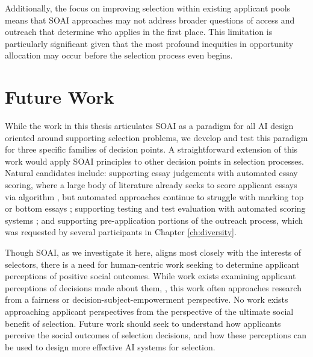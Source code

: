 Additionally, the focus on improving selection within existing applicant pools means that SOAI approaches may not address broader questions of access and outreach that determine who applies in the first place. This limitation is particularly significant given that the most profound inequities in opportunity allocation may occur before the selection process even begins.

\section{Future Work}
While the work in this thesis articulates SOAI as a paradigm for all AI design oriented around supporting selection problems, we develop and test this paradigm for three specific families of decision points. A straightforward extension of this work would apply SOAI principles to other decision points in selection processes. Natural candidates include: supporting essay judgements with automated essay scoring, where a large body of literature already seeks to score applicant essays via algorithm \cite{cozma_automated_2018,ramesh_automated_2022,wang_use_2022,elijahthesis}, but automated approaches continue to struggle with marking top or bottom essays \cite{elijahthesis}; supporting testing and test evaluation with automated scoring systems \cite{organisciak_beyond_2023,condon2014international}; and supporting pre-application portions of the outreach process, which was requested by several participants in Chapter \ref{ch:diversity}.

Though SOAI, as we investigate it here, aligns most closely with the interests of selectors, there is a need for human-centric work seeking to determine applicant perceptions of positive social outcomes. While work exists examining applicant perceptions of decisions made about them, \cite{pandey_applicants_2022,horodyski_applicants_2023}, this work often approaches research from a fairness or decision-subject-empowerment perspective. No work exists approaching applicant perspectives from the perspective of the ultimate social benefit of selection. Future work should seek to understand how applicants perceive the social outcomes of selection decisions, and how these perceptions can be used to design more effective AI systems for selection.

